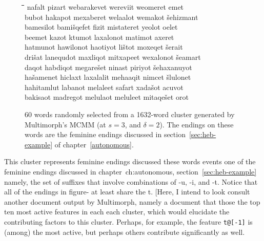 \begin{figure}[ht]
\begin{tabbing}
\hspace*{14ex}\= \hspace*{14ex}\=\hspace*{14ex}\=\hspace*{14ex}\=\hspace*{14ex}\=\hspace*{14ex} \kill
nafalt \> pizart \> webarakevet \> wereviit \> weomeret \> emet\\
bubot \> hakapot \> mexaberet \> welaalot \> wemakot \>\v{s}ehizmant\\
bamesilot \> bami\v{s}qefet \> fizit \> mistateret \> yeolot \> oelet\\
beemet \> kazot \> ktumot \> laxalonot \> matimot \> axeret\\
hatmunot \> hawilonot \> haotiyot \> li\v{s}tot \> moxeqet \>\v{s}erait\\
dri\v{s}at \> lanequdot \> maxliqot \> mitxapeet \> wexalonot \>\v{s}eamart\\
daqot \> habdiqot \> megare\v{s}et \> ninast \> piriyot \>\v{s}ehaxanuyot\\
ha\v{s}amenet \> hiclaxt \> laxalalit \> mehaaqit \> nimcet \>\v{s}lulonet\\
hahitamlut \> labanot \> melaleet \> safart \> xada\v{s}ot \> acuvot\\
bakisaot \> madregot \> melulaot \> meluleet \> mitaqe\v{s}et \> orot
\end{tabbing}
\caption{60 words randomly selected from a 1632-word cluster generated by Multimorph's MCMM (at $s = 3$, and $\delta = 2$). The endings on these words are the feminine endings discussed in section~\ref{sec:heb-example} of chapter~\ref{autonomous}.} %
\label{fig:cl-fem}
\end{figure}

This cluster represents feminine endings discussed these words events one of the feminine endings discussed in chapter~{ch:autonomous}, section~\ref{sec:heb-example} namely, the set of suffixes that involve combinations of {-u}, {-i}, and {-t}. Notice that all of the endings in figure- at least share the t. [Here, I intend to look consult another document output by Multimorph, namely a document that those the top ten most active features in each each cluster,
which would elucidate the contributing factors to this cluster. Perhaps, for example, the feature \texttt{t@[-1]} is (among) the most active, but perhaps others contribute significantly as well. 

